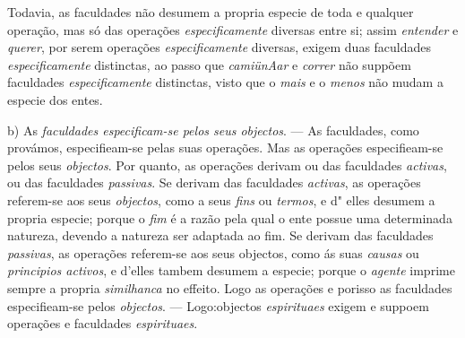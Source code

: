 Todavia, as faculdades não desumem a propria especie de toda e qualquer operação, mas só das operações \emph{especificamente} diversas entre si; assim \emph{entender} e \emph{querer}, por serem operações \emph{especificamente} diversas, exigem duas faculdades \emph{especificamente} distinctas, ao passo que \emph{camiünAar} e \emph{correr} não suppõem faculdades \emph{especificamente} distinctas, visto que o \emph{mais} e o \emph{menos} não mudam a especie dos entes.

b) As \emph{faculdades especificam-se pelos seus objectos}. --- As faculdades, como provámos, especifieam-se pelas suas operações. Mas as operações especifieam-se pelos seus \emph{objectos}. Por quanto, as operações derivam ou das faculdades \emph{activas}, ou das faculdades \emph{passivas}. Se derivam das faculdades \emph{activas}, as operações referem-se aos seus \emph{objectos}, como a seus \emph{fins} ou \emph{termos}, e d" elles desumem a propria especie; porque o \emph{fim} é a razão pela qual o ente possue uma determinada natureza, devendo a natureza ser adaptada ao fim. Se derivam das faculdades \emph{passivas}, as operações referem-se aos seus objectos, como ás suas \emph{causas} ou \emph{principios activos}, e d'elles tambem desumem a especie; porque o \emph{agente} imprime sempre a propria \emph{similhanca} no effeito. Logo as operações e porisso as faculdades especifieam-se pelos \emph{objectos}. --- Logo:objectos \emph{espirituaes} exigem e suppoem operações e faculdades \emph{espirituaes}.


